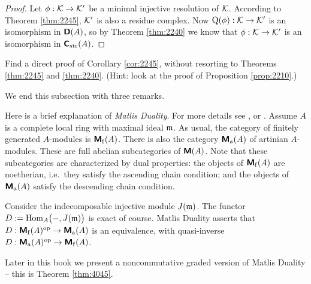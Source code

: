 \begin{proof}
Let $\phi : \mathcal{K} \to \mathcal{K}'$ be a minimal injective resolution of $\mathcal{K}$. According 
to Theorem \ref{thm:2245}, $\mathcal{K}'$ is also a residue complex. Now 
$\operatorname{Q}(\phi) : \mathcal{K} \to \mathcal{K}'$ is an isomorphism in $\boldsymbol{\mathsf{D}}(A)$, so by Theorem
\ref{thm:2240} we know that $\phi : \mathcal{K} \to \mathcal{K}'$ is an isomorphism in 
$\boldsymbol{\mathsf{C}}_{\mathrm{str}}(A)$. 
\end{proof}

\begin{exer} \label{exer:2245}
Find a direct proof of Corollary \ref{cor:2245}, without resorting to Theorems 
\ref{thm:2245} and \ref{thm:2240}. (Hint: look at the proof of Proposition 
\ref{prop:2210}.) 
\end{exer}

We end this subsection with three remarks. 

\begin{rem} \label{rem:2245}
Here is a brief explanation of {\em Matlis Duality}. For more details see 
\cite[Section V.5]{RD}, \cite[Theorem 18.6]{Mats} or \cite[Section 10.2]{BrSh}. 
Assume $A$ is a complete local ring with maximal ideal $\mathfrak{m}$. As usual, the 
category of finitely generated $A$-modules is $\boldsymbol{\mathsf{M}}_{\mathrm{f}}(A)$. There is 
also the category $\boldsymbol{\mathsf{M}}_{\mathrm{a}}(A)$ of artinian $A$-modules. These are 
full abelian subcategories of $\boldsymbol{\mathsf{M}}(A)$. Note that these subcategories are 
characterized by dual properties: the objects of $\boldsymbol{\mathsf{M}}_{\mathrm{f}}(A)$ are 
noetherian, i.e.\ they satisfy the ascending chain condition; and the objects 
of $\boldsymbol{\mathsf{M}}_{\mathrm{a}}(A)$ satisfy the descending chain condition. 

Consider the indecomposable injective module $J(\mathfrak{m})$.  
The functor 
$D := \lb \opn{Hom}_A \bigl( -, J(\m) \bigr)$  
is exact of course. Matlis Duality asserts that
$D : \boldsymbol{\mathsf{M}}_{\mathrm{f}}(A)^{\mathrm{op}} \to \boldsymbol{\mathsf{M}}_{\mathrm{a}}(A)$ 
is an equivalence, with quasi-inverse 
$D : \boldsymbol{\mathsf{M}}_{\mathrm{a}}(A)^{\mathrm{op}} \to \boldsymbol{\mathsf{M}}_{\mathrm{f}}(A)$.

Later in this book we present a noncommutative graded version of Matlis 
Duality -- this is Theorem \ref{thm:4045}.
\end{rem}

